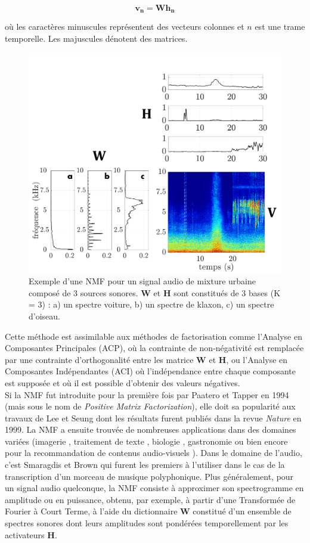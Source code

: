 \begin{equation}\label{eq:nmf_h}
\mathbf{v_n} = \mathbf{Wh_n}
\end{equation}

où les caractères minuscules représentent des vecteurs colonnes et $n$ est une trame temporelle. Les majuscules dénotent des matrices.

\begin{figure}[t]
\centering
\includegraphics[width=.5\textwidth]{./figures/NMF/schema_introduction_nmf_fr.pdf}
\caption{Exemple d'une NMF pour un signal audio de mixture urbaine composé de 3 sources sonores. $\mathbf{W}$ et $\mathbf{H}$ sont constitués de 3 bases (K = 3) : a) un spectre voiture, b) un spectre de klaxon, c) un spectre d'oiseau.}
\label{fig:ex_NMF}
\end{figure}


Cette méthode est assimilable aux méthodes de factorisation comme l'Analyse en Composantes Principales (ACP), où la contrainte de non-négativité est remplacée par une contrainte d'orthogonalité entre les matrice $\mathbf{W}$ et $\mathbf{H}$, ou l'Analyse en Composantes Indépendantes (ACI) où l'indépendance entre chaque composante est supposée et où il est possible d'obtenir des valeurs négatives. \\


Si la NMF fut introduite pour la première fois par Paatero et Tapper \cite{paatero_positive_1994} en 1994 (mais sous le nom de \textit{Positive Matrix Factorization}), elle doit sa popularité aux travaux de Lee et Seung \cite{lee_learning_1999} dont les résultats furent publiés dans la revue \textit{Nature} en 1999. La NMF a ensuite trouvée de nombreuses applications dans des domaines variées
(imagerie \cite{guillamet_introducing_2003, monga_robust_2007}, traitement de texte \cite{xu_document_2003, berry_email_2005}, biologie \cite{gao_improving_2005, chen_constrained_nodate}, gastronomie \cite{hawkins_clustering_2006} ou bien encore pour la recommandation de contenus audio-visuels \cite{luo2014efficient}). Dans le domaine de l'audio, c'est Smaragdis et Brown \cite{smaragdis_non-negative_2003} qui furent les premiers à l'utiliser dans le cas de la transcription d'un morceau de musique polyphonique. Plus généralement, pour un signal audio quelconque, la NMF consiste à approximer son spectrogramme en amplitude ou en puissance, obtenu, par exemple, à partir d'une Transformée de Fourier à Court Terme, à l'aide du dictionnaire $\textbf{W}$ constitué d'un ensemble de spectres sonores dont leurs amplitudes sont pondérées temporellement par les activateurs $\textbf{H}$.

